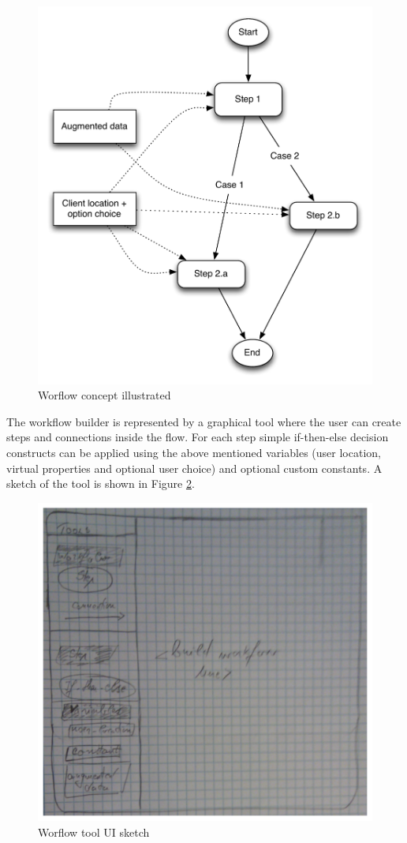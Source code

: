 \begin{figure}[H]
	\centering
	\includegraphics[width=1.0\linewidth]{fig/workflow}
	\caption{Worflow concept illustrated}
	\label{fig.design.workflow}
\end{figure}
The workflow builder is represented by a graphical tool where the user can create steps and connections inside the flow. For each step simple if-then-else decision constructs can be applied using the above mentioned variables (user location, virtual properties and optional user choice) and optional custom constants. A sketch of the tool is shown in Figure \ref{fig.design.workflow_sketch}.
\begin{figure}[H]
	\centering
	\includegraphics[width=0.9\linewidth]{fig/workflow_sketch}
	\caption{Worflow tool UI sketch}
	\label{fig.design.workflow_sketch}
\end{figure}
\\

